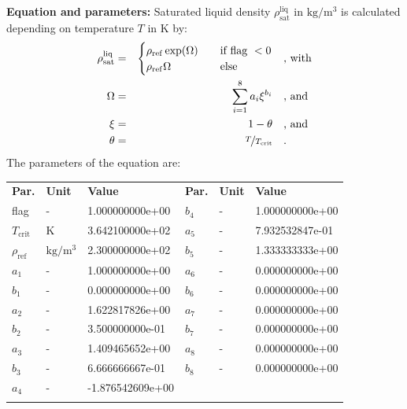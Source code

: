 \textbf{Equation and parameters:}
\newline
%
Saturated liquid density $\rho_\mathrm{sat}^\mathrm{liq}$ in $\si{\kilogram\per\cubic\meter}$ is calculated depending on temperature $T$ in $\si{\kelvin}$ by:
%
\begin{equation*}
\begin{split}
\rho_\mathrm{sat}^\mathrm{liq} &=& \begin{cases} \rho_\mathrm{ref} \exp(\Omega) & \quad \text{if flag } < 0 \\ \rho_\mathrm{ref} \Omega & \quad \text{else} \end{cases} & \quad\text{, with} \\
\Omega &=& \sum_{i=1}^{8} a_i \xi^{b_i} & \quad\text{, and} \\
\xi &=& 1 - \theta & \quad\text{, and} \\
\theta &=& \nicefrac{T}{T_\mathrm{crit}} & \quad\text{.}
\end{split}
\end{equation*}
%
The parameters of the equation are:
%
\begin{longtable}[l]{lll|lll}
\toprule
\addlinespace
\textbf{Par.} & \textbf{Unit} & \textbf{Value} &	\textbf{Par.} & \textbf{Unit} & \textbf{Value} \\
\addlinespace
\midrule
\endhead

\bottomrule
\endfoot
\bottomrule
\endlastfoot
\addlinespace

flag & - & 1.000000000e+00 & $b_4$ & - & 1.000000000e+00 \\
$T_\mathrm{crit}$ & $\si{\kelvin}$ & 3.642100000e+02 & $a_5$ & - & 7.932532847e-01 \\
$\rho_\mathrm{ref}$ & $\si{\kilogram\per\cubic\meter}$ & 2.300000000e+02 & $b_5$ & - & 1.333333333e+00 \\
$a_1$ & - & 1.000000000e+00 & $a_6$ & - & 0.000000000e+00 \\
$b_1$ & - & 0.000000000e+00 & $b_6$ & - & 0.000000000e+00 \\
$a_2$ & - & 1.622817826e+00 & $a_7$ & - & 0.000000000e+00 \\
$b_2$ & - & 3.500000000e-01 & $b_7$ & - & 0.000000000e+00 \\
$a_3$ & - & 1.409465652e+00 & $a_8$ & - & 0.000000000e+00 \\
$b_3$ & - & 6.666666667e-01 & $b_8$ & - & 0.000000000e+00 \\
$a_4$ & - & -1.876542609e+00 & & & \\

\addlinespace\end{longtable}

